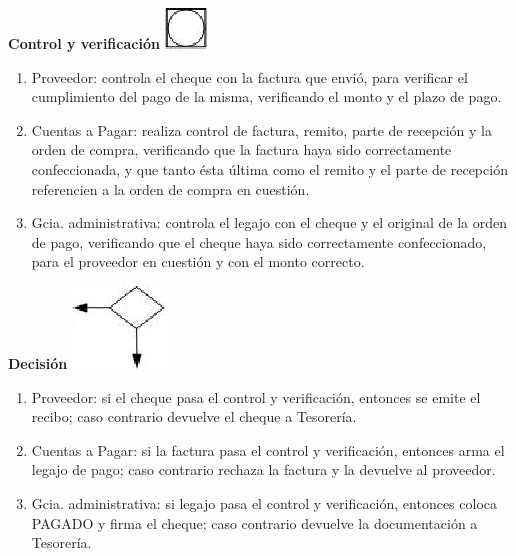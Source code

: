\begin{center}
  \textbf{Control y verificación}
  \includegraphics{./Images/Simbolos/simbolo-Control-y-Verificacion.png}
\end{center}
\begin{enumerate}
  \item Proveedor: controla el cheque con la factura que envió, para verificar el cumplimiento del pago de la misma, verificando el monto y el plazo de pago.
  \item Cuentas a Pagar: realiza control de factura, remito, parte de recepción y la orden de compra, verificando que la factura haya sido correctamente confeccionada, y que tanto ésta última como el remito y el parte de recepción referencien a la orden de compra en cuestión. 
  \item Gcia. administrativa: controla el legajo con el cheque y el original de la orden de pago, verificando que el cheque haya sido correctamente confeccionado, para el proveedor en cuestión y con el monto correcto.
\end{enumerate}

\begin{center}
  \textbf{Decisión}
  \includegraphics{./Images/Simbolos/simbolo-Decision.png}
\end{center}
\begin{enumerate}
  \item Proveedor: si el cheque pasa el control y verificaci\'on, entonces se emite el recibo; caso contrario devuelve el cheque a Tesorería.
  \item Cuentas a Pagar: si la factura pasa el control y verificaci\'on, entonces arma el legajo de pago; caso contrario rechaza la factura y la devuelve al proveedor.
  \item Gcia. administrativa: si legajo pasa el control y verificaci\'on, entonces coloca PAGADO y firma el cheque; caso contrario devuelve la documentación a Tesorería.
\end{enumerate}

